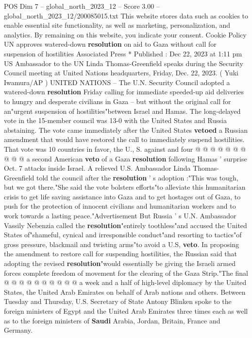\begin{textsample}{POS Dim 7 – global\_north\_2023\_12 – Score 3.00 – global\_north\_2023\_12/200085015.txt}  \label{ex:f7_pos_305}
This website stores data such as cookies to enable essential site functionality, as well as marketing, personalization, and analytics.
By remaining on this website, you indicate your consent.
Cookie Policy UN approves watered-down \textbf{resolution} on aid to Gaza without call for suspension of hostilities Associated Press * Published : Dec 22, 2023 at 1:11 pm US Ambassador to the UN Linda Thomas-Greenfield speaks during the Security Council meeting at United Nations headquarters, Friday, Dec. 22, 2023. ( Yuki Iwamura/AP ) UNITED NATIONS -- The U.N.
Security Council adopted a watered-down \textbf{resolution} Friday calling for immediate speeded-up aid deliveries to hungry and desperate civilians in Gaza -- but without the original call for an"urgent suspension of hostilities"between Israel and Hamas.
The long-delayed vote in the 15-member council was 13-0 with the United States and Russia abstaining.
The vote came immediately after the United States \textbf{vetoed} a Russian amendment that would have restored the call to immediately suspend hostilities.
That vote was 10 countries in favor, the U., S. against and four @ @ @ @ @ @ @ @ @ @ a second American \textbf{veto} of a Gaza \textbf{resolution} following Hamas ' surprise Oct. 7 attacks inside Israel.
A relieved U.S.
Ambassador Linda Thomas-Greenfield told the council after the \textbf{resolution} ' s adoption :"This was tough, but we got there."She said the vote bolsters efforts"to alleviate this humanitarian crisis to get life saving assistance into Gaza and to get hostages out of Gaza, to push for the protection of innocent civilians and humanitarian workers and to work towards a lasting peace."Advertisement But Russia ' s U.N.
Ambassador Vassily Nebenzia called the \textbf{resolution}"entirely toothless"and accused the United States of"shameful, cynical and irresponsible conduct"and resorting to tactics"of gross pressure, blackmail and twisting arms"to avoid a U.S, \textbf{veto}.
In proposing the amendment to restore call for suspending hostilities, the Russian said that adopting the revised \textbf{resolution}"would essentially be giving the Israeli armed forces complete freedom of movement for the clearing of the Gaza Strip."The final @ @ @ @ @ @ @ @ @ @ a week and a half of high-level diplomacy by the United States, the United Arab Emirates on behalf of Arab nations and others.
Between Tuesday and Thursday, U.S.
Secretary of State Antony Blinken spoke to the foreign ministers of Egypt and the United Arab Emirates three times each as well as to the foreign ministers of \textbf{Saudi} Arabia, Jordan, Britain, France and Germany.

\end{textsample}
